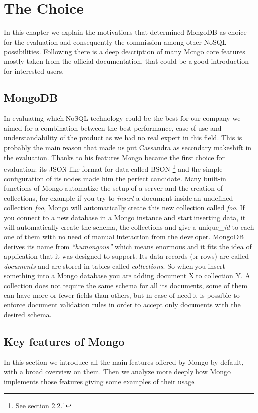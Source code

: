 \chapter{The Choice}
\label{cha:2}
In this chapter we explain the motivations that determined  MongoDB as choice for the evaluation and consequently the commission among other NoSQL possibilities.
Following there is a deep description of many Mongo core features mostly taken from the official documentation, that could be a good introduction for interested users.

\section{MongoDB}
\label{sec:1}
In evaluating which NoSQL technology could be the best for our company we aimed for a combination between the best performance,  ease of use and understandability of the product as we had no real expert in this field.
This is probably the main reason that made us put Cassandra as secondary makeshift in the evaluation.
Thanks to his features Mongo became the first choice for evaluation: its JSON-like format for data called BSON \footnote{See section 2.2.1} and the simple configuration of its nodes made him the perfect candidate.
Many built-in functions of Mongo automatize the setup of a server and the creation of collections, for example if you try to \textit{insert} a document inside an undefined collection \textit{foo}, Mongo will automatically create this new collection called \textit{foo}.
If you connect to a new database in a Mongo instance and start inserting data, it will automatically create the schema, the collections and give a unique\textit{\_id} to each one of them  with no need of manual interaction from the developer.
MongoDB derives its name from \textit{“humongous”} which means enormous and it fits the idea of application that it was designed to support.
Its data records (or rows) are called \textit{documents} and are stored in tables called \textit{collections}. So when you insert something into a Mongo database you are adding document X to collection Y.
A collection does not require the same schema for all its documents, some of them can have more or fewer fields than others, but in case of need it is possible to enforce document validation rules in order to accept only documents with the desired schema.

\section{Key features of Mongo}
\label{sec:2}
In this section we introduce all the main features offered by Mongo by default, with a broad overview on them. 
Then we analyze more deeply how Mongo implements those features giving some examples of their usage.

